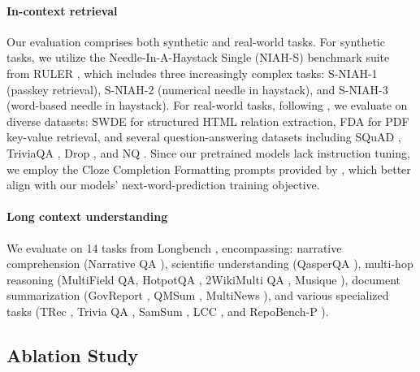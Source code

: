 \documentclass{article}
\begin{document}
\paragraph{In-context retrieval} Our evaluation comprises both synthetic and real-world tasks. For synthetic tasks, we utilize the Needle-In-A-Haystack Single (NIAH-S) benchmark suite from RULER \citep{hsieh2024ruler}, which includes three increasingly complex tasks: S-NIAH-1 (passkey retrieval), S-NIAH-2 (numerical needle in haystack), and S-NIAH-3 (word-based needle in haystack).
For real-world tasks, following \citet{arora-2024-jrt}, we evaluate on diverse datasets: SWDE \citep{lockard_openceres_2019} for structured HTML relation extraction, FDA \citep{arora_language_2023} for PDF key-value retrieval, and several question-answering datasets including SQuAD \citep{rajpurkar_know_2018}, TriviaQA \citep{JoshiTriviaQA2017}, Drop \citep{dua2019drop}, and NQ \citep{47761}. Since our pretrained models lack instruction tuning, we employ the Cloze Completion Formatting prompts provided by \citet{arora-2024-jrt}, which better align with our models' next-word-prediction training objective.
\paragraph{Long context understanding} We evaluate on 14 tasks from Longbench \citep{bai2023longbench}, encompassing: narrative comprehension (Narrative QA \citep{kocisky-etal-2018-narrativeqa}), scientific understanding (QasperQA \citep{dasigi2021qasper}), multi-hop reasoning (MultiField QA, HotpotQA \citep{yang2018hotpotqa}, 2WikiMulti QA \citep{ho2020constructing}, Musique \citep{trivedi2022musique}), document summarization (GovReport \citep{huang2021govreport}, QMSum \citep{zhong2021qmsum}, MultiNews \citep{fabbri2019multinews}), and various specialized tasks (TRec \citep{li2002learning}, Trivia QA \citep{joshi2017triviaqa}, SamSum \citep{gliwa2019samsum}, LCC \citep{guo2023longcoder}, and RepoBench-P \citep{liu2023repobench}).

\subsection{Ablation Study}
\label{sec:ablation_study}
\end{document}
